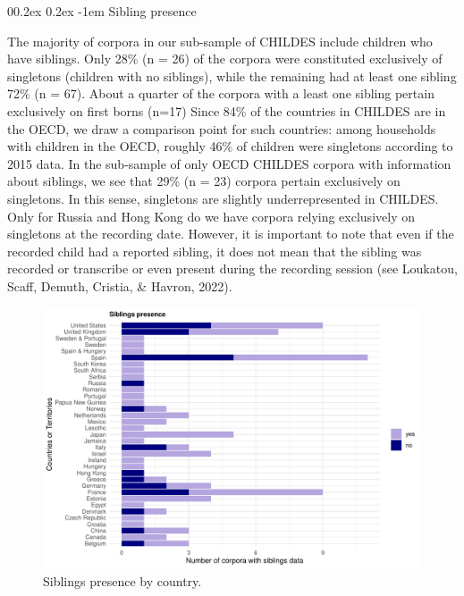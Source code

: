 \documentclass[
  man,floatsintext]{apa6}
\makeatletter
\let\oldparagraph\paragraph
\renewcommand{\paragraph}[1]{\oldparagraph{#1}\mbox{}}
\renewcommand{\paragraph}{\@startsection{paragraph}{4}{\parindent}%
  {0\baselineskip \@plus 0.2ex \@minus 0.2ex}%
  {-1em}%
  {\normalfont\normalsize\bfseries\itshape\typesectitle}}
\makeatother
\begin{document}
\hypertarget{sibling-presence}{%
\paragraph{Sibling presence}\label{sibling-presence}}

The majority of corpora in our sub-sample of CHILDES include children who have siblings. Only 28\% (n = 26) of the corpora were constituted exclusively of singletons (children with no siblings), while the remaining had at least one sibling 72\% (n = 67). About a quarter of the corpora with a least one sibling pertain exclusively on first borns (n=17)
Since 84\% of the countries in CHILDES are in the OECD, we draw a comparison point for such countries: among households with children in the OECD, roughly 46\% of children were singletons according to 2015 data. In the sub-sample of only OECD CHILDES corpora with information about siblings, we see that 29\% (n = 23) corpora pertain exclusively on singletons. In this sense, singletons are slightly underrepresented in CHILDES. Only for Russia and Hong Kong do we have corpora relying exclusively on singletons at the recording date.
However, it is important to note that even if the recorded child had a reported sibling, it does not mean that the sibling was recorded or transcribe or even present during the recording session (see Loukatou, Scaff, Demuth, Cristia, \& Havron, 2022).

\begin{figure}
\centering
\includegraphics{CHILDES_short_files/figure-latex/figure6-1.pdf}
\caption{\label{fig:figure6}Siblings presence by country.}
\end{figure}
\end{document}
